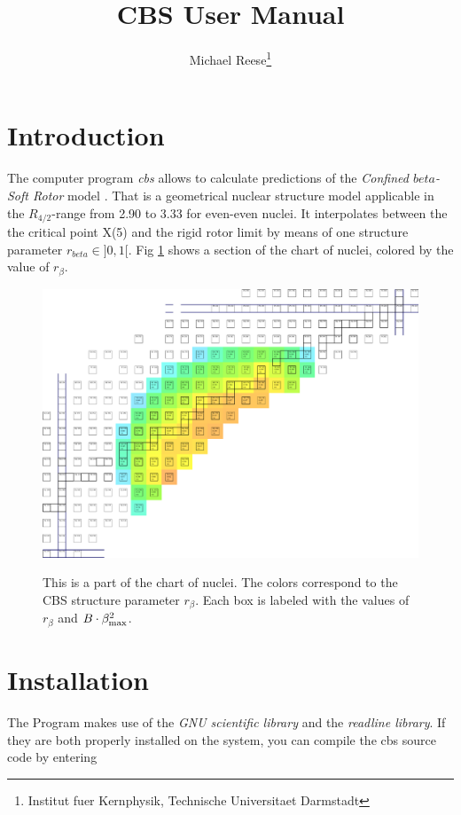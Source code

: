 \documentclass[10pt,a4paper]{article}
\title{CBS User Manual}
\author{Michael Reese\footnote{Institut fuer Kernphysik, Technische Universitaet Darmstadt}}
\begin{document}
\maketitle

\tableofcontents
\newpage

\section{Introduction}
The computer program \textit{cbs} allows to calculate predictions of the \textit{Confined $beta$-Soft Rotor} model \cite{Pietralla}. That is a geometrical nuclear structure model applicable in the $R_{4/2}$-range from 2.90 to 3.33 for even-even nuclei. It interpolates between the the critical point X(5) \cite{Iachello} and the rigid rotor limit by means of one structure parameter $r_{beta} \in ]0,1[$. Fig \ref{CBSchart} shows a section of the chart of nuclei, colored by the value of $r_{\beta}$.
\begin{figure}
\includegraphics[width=\textwidth]{r_beta_chart.pdf} \label{CBSchart}
\caption{This is a part of the chart of nuclei. The colors correspond to the CBS structure parameter $r_{\beta}$. Each box is labeled with the values of $r_{\beta}$ and $B\cdot\beta_{\rm max}^2$.}
\end{figure}

\section{Installation}
The Program makes use of the \textit{GNU scientific library} and the \textit{readline library}. If they are both properly installed on the system, you can compile the cbs source code by entering 
\end{document}
